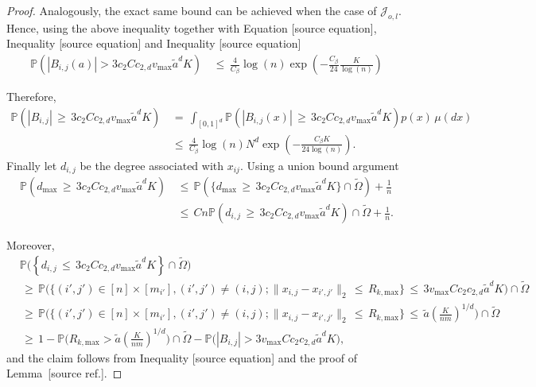 \documentclass[twoside,11pt]{article}
\makeatletter
\newcommand{\discardlabel}[1]{}
\newcommand{\discardtwo}[2]{}
\newcommand{\legacyref}[1]{\textup{[source ref.]}}
\newcommand{\legacyeqref}[1]{\textup{[source equation]}}
\newenvironment{legacycomparison}{%
  \begingroup\color{legacygray}%
  \let\label\discardlabel
  \let\originallabel\discardlabel
  \let\ref\legacyref
  \let\pageref\legacyref
  \let\eqref\legacyeqref
  \let\cref\legacyref
  \let\Cref\legacyref
  \let\autoref\legacyref
  \let\aliasref\discardtwo
}{\endgroup}
\newcommand{\aliasref}[2]{%
  \@ifundefined{r@#2}{}{%
    \expandafter\let\csname r@#1\expandafter\endcsname\csname r@#2\endcsname}}
\makeatother
\begin{document}
\begin{legacycomparison}
\begin{proof}
Analogously, the exact same bound can be achieved when the case of \( \mathcal{J}_{o,l} \). Hence, using the above inequality together with Equation \eqref{eq:288}, Inequality \eqref{eq:302} and Inequality \eqref{eq:303}
\begin{align}
    \mathbb{P}\left( |B_{i,j}(a)| > 3c_2Cc_{2,d}v_{\text{max}}{\tilde a}^dK \right) 
    &\,\leq\, \frac{4}{C_{\beta}} \log(n)\exp\left( -\frac{C_{\beta}}{24} \frac{K}{\log(n)} \right) \label{eq:306}
\end{align}

Therefore,
\begin{align}
\mathbb{P} \left( |B_{i,j}| \,\geq\, 3c_2Cc_{2,d}v_{\text{max}}{\tilde a}^dK \right) &\,=\, \int_{[0,1]^d} \mathbb{P} \left( |B_{i,j}(x)| \,\geq\, 3c_2Cc_{2,d}v_{\text{max}}{\tilde a}^dK \right) p(x) \, \mu(dx) \nonumber \\
&\,\leq\, \frac{4}{C_{\beta}} \log(n)N^d \exp\left(-\frac{C_{\beta} K}{24 \log(n)}\right). \label{eq:304__duplicate3}
\end{align}
Finally let \( d_{i,j} \) be the degree associated with \( x_{ij} \). Using a union bound argument
\begin{align}
\mathbb{P} \left( d_{\text{max}} \,\geq\, 3c_2Cc_{2,d}v_{\text{max}}{\tilde a}^dK \right) &\,\leq\, \mathbb{P} \left( \{ d_{\text{max}} \,\geq\, 3c_2Cc_{2,d}v_{\text{max}}{\tilde a}^dK \} \cap \tilde \Omega \right) + \frac{1}{n} \nonumber \\
&\,\leq\, Cn\mathbb{P} \left( d_{i,j} \,\geq\, 3c_2Cc_{2,d}v_{\text{max}}{\tilde a}^dK \right) \cap \tilde \Omega + \frac{1}{n}.
\end{align}
 





Moreover,
\begin{align}
    &\mathbb{P} \big( \left\{ d_{i,j} \,\leq\, 3c_2Cc_{2,d}v_{\text{max}}{\tilde a}^dK \right\}  \cap \tilde \Omega\big)  \nonumber \\
    &\,\geq\, \mathbb{P} \Bigg( \Big\{ (i',j') \in [n] \times [m_{i'}], (i',j') \neq (i,j) ; \|x_{i,j} - x_{i',j'}\|_2 \,\leq\, R_{k,\text{max}} \Big\} \,\leq\, 3v_{\text{max}}Cc_2c_{2,d}\tilde a^dK \Bigg) \cap \tilde \Omega \nonumber \\
    &\,\geq\, \mathbb{P} \Bigg( \Big\{ (i',j') \in [n] \times [m_{i'}], (i',j') \neq (i,j) ; \|x_{i,j} - x_{i',j'}\|_2 \,\leq\, R_{k,\text{max}} \Big\} \,\leq\, \tilde a \left(\frac{K}{nm}\right)^{1/d} \Bigg) \cap \tilde \Omega \nonumber \\
    &\,\geq\, 1 - \mathbb{P} \Bigg( R_{k,\text{max}} > \tilde a \left(\frac{K}{nm}\right)^{1/d} \Bigg) \cap \tilde \Omega - \mathbb{P} \Big( |B_{i,j}| > 3v_{\text{max}}Cc_2c_{2,d}\tilde a^dK \Big), \label{eq:lemma14_inequality}
\end{align}
and the claim follows from Inequality \eqref{eq:304} and the proof of Lemma~\ref{Lemma_13}.


\end{proof}
\end{legacycomparison}
\end{document}
